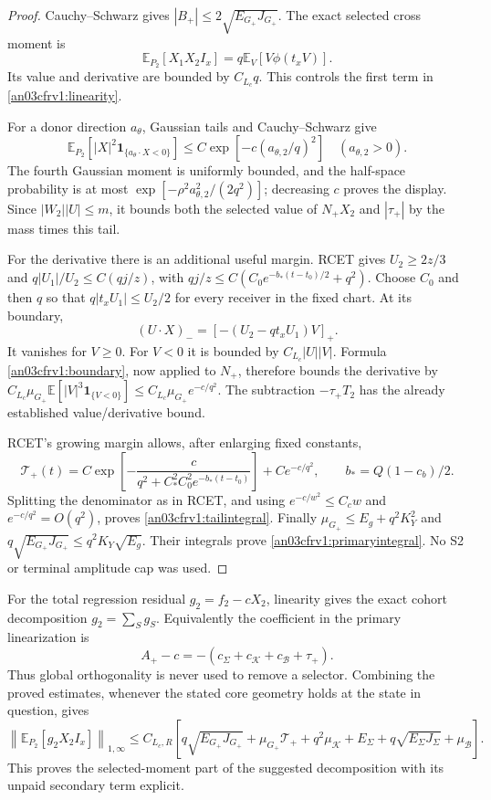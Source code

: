\documentclass[11pt]{article}
\theoremstyle{remark}\newtheorem{remark}[proposition]{Remark}
\newcommand{\E}{\mathbb E}
\newcommand{\one}{\mathbf1}
\newcommand{\Gp}{G_+}
\newcommand{\KK}{\mathcal K}
\newcommand{\BB}{\mathcal B}
\begin{document}
\begin{proof}
Cauchy--Schwarz gives $|B_+|\le2\sqrt{E_{\Gp}J_{\Gp}}$.
The exact selected cross moment is
\[
 \E_{P_2}[X_1X_2I_x]=q\E_V[V\phi(t_xV)].
\]
Its value and derivative are bounded by $C_{L_c}q$.
This controls the first term in \eqref{an03cfrv1:linearity}.

For a donor direction $a_\theta$, Gaussian tails and
Cauchy--Schwarz give
\[
 \E_{P_2}[|X|^2\one_{\{a_\theta\cdot X<0\}}]
 \le C\exp[-c(a_{\theta,2}/q)^2]\quad(a_{\theta,2}>0).
\]
The fourth Gaussian moment is uniformly bounded, and the
half-space probability is at most
$\exp[-\rho^2a_{\theta,2}^2/(2q^2)]$; decreasing $c$ proves
the display. Since $|W_2||U|\le m$, it bounds both the
selected value of $N_+X_2$ and $|\tau_+|$ by the mass
times this tail.

For the derivative there is an additional useful margin.
RCET gives $U_2\ge2z/3$ and
$q|U_1|/U_2\le C(qj/z)$, with
$qj/z\le C(C_0e^{-b_*(t-t_0)/2}+q^2)$.
Choose $C_0$ and then $q$ so that
$q|t_xU_1|\le U_2/2$ for every receiver in the fixed chart.
At its boundary,
\[
 (U\cdot X)_-=[-(U_2-qt_xU_1)V]_+ .
\]
It vanishes for $V\ge0$. For $V<0$ it is bounded by
$C_{L_c}|U||V|$.
Formula \eqref{an03cfrv1:boundary}, now applied to $N_+$,
therefore bounds the derivative by
$C_{L_c}\mu_{\Gp}\E[|V|^3\one_{\{V<0\}}]
\le C_{L_c}\mu_{\Gp}e^{-c/q^2}$.
The subtraction $-\tau_+T_2$ has the already established
value/derivative bound.

RCET's growing margin allows, after enlarging fixed constants,
\[
 \mathcal T_+(t)=C\exp\left[
 -\frac{c}{q^2+C_*^2C_0^2e^{-b_*(t-t_0)}}\right]+Ce^{-c/q^2},
 \qquad b_*=Q(1-c_b)/2.
\]
Splitting the denominator as in RCET, and using
$e^{-c/w^2}\le C_c w$ and $e^{-c/q^2}=O(q^2)$, proves
\eqref{an03cfrv1:tailintegral}.
Finally $\mu_{\Gp}\le E_g+q^2K_Y^2$ and
$q\sqrt{E_{\Gp}J_{\Gp}}\le q^2K_Y\sqrt{E_g}$.
Their integrals prove \eqref{an03cfrv1:primaryintegral}.
No S2 or terminal amplitude cap was used.
\end{proof}

For the total regression residual $g_2=f_2-cX_2$, linearity
gives the exact cohort decomposition $g_2=\sum_S g_S$.
Equivalently the coefficient in the primary linearization is
\begin{equation}
 A_+-c=-(c_\Sigma+c_{\KK}+c_{\BB}+\tau_+).
 \label{an03cfrv1:ledgerdifference}
\end{equation}
Thus global orthogonality is never used to remove a selector.
Combining the proved estimates, whenever the stated core
geometry holds at the state in question, gives
\begin{equation}
 \left\|\E_{P_2}[g_2X_2I_x]\right\|_{1,\infty}
 \le C_{L_c,R}\left[
 q\sqrt{E_{\Gp}J_{\Gp}}+\mu_{\Gp}\mathcal T_+
 +q^2\mu_{\KK}
 +E_\Sigma+q\sqrt{E_\Sigma J_\Sigma}+\mu_{\BB}\right].
 \label{an03cfrv1:totaldefect}
\end{equation}
This proves the selected-moment part of the suggested
decomposition with its unpaid secondary term explicit.
\end{document}
